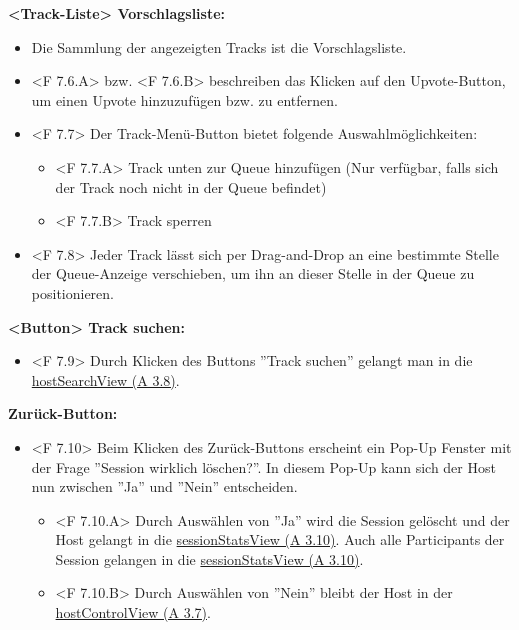 \documentclass[oneside, ngerman]{sdqtechreport}
\begin{document}
\textbf{<Track-Liste> Vorschlagsliste:}
\begin{itemize}
    \item Die Sammlung der angezeigten Tracks ist die Vorschlagsliste.
    \hypertarget{<F 7.6.A>}{}
    \hypertarget{<F 7.6.B>}{}
    \item <F 7.6.A> bzw. <F 7.6.B> beschreiben das Klicken auf den Upvote-Button, um einen Upvote hinzuzufügen bzw. zu entfernen.
    \hypertarget{<F 7.7>}{}
    \item <F 7.7> Der Track-Menü-Button bietet folgende Auswahlmöglichkeiten:
    \begin{itemize}
        \hypertarget{<F 7.7.A>}{}
        \item <F 7.7.A> Track unten zur Queue hinzufügen (Nur verfügbar, falls sich der Track noch nicht in der Queue befindet)
        \hypertarget{<F 7.7.B>}{}
        \item <F 7.7.B> Track sperren
    \end{itemize}
    \hypertarget{<F 7.8>}{}
    \item <F 7.8> Jeder Track lässt sich per Drag-and-Drop an eine bestimmte Stelle der Queue-Anzeige verschieben, um ihn an dieser Stelle in der Queue zu positionieren.
\end{itemize}

\textbf{<Button> Track suchen:}
\begin{itemize}
    \hypertarget{<F 7.9>}{}
    \item <F 7.9> Durch Klicken des Buttons ''Track suchen'' gelangt man in die \hyperlink{hostSearchView}{hostSearchView (A 3.8)}.
\end{itemize}

\textbf{Zurück-Button:}
\begin{itemize}
    \hypertarget{<F 7.10>}{}
    \item <F 7.10> Beim Klicken des Zurück-Buttons erscheint ein Pop-Up Fenster mit der Frage ''Session wirklich löschen?''. In diesem Pop-Up kann sich der Host nun zwischen ''Ja'' und ''Nein'' entscheiden.
    \begin{itemize}
    \hypertarget{<F 7.10.A>}{}
        \item <F 7.10.A> Durch Auswählen von ''Ja'' wird die Session gelöscht und der Host gelangt in die \hyperlink{sessionStatsView}{sessionStatsView (A 3.10)}. Auch alle Participants der Session gelangen in die \hyperlink{sessionStatsView}{sessionStatsView (A 3.10)}.
        \hypertarget{<F 7.10.B>}{}
        \item <F 7.10.B> Durch Auswählen von ''Nein'' bleibt der Host in der \hyperlink{hostControlView}{hostControlView (A 3.7)}.
    \end{itemize}
\end{itemize}
\end{document}
